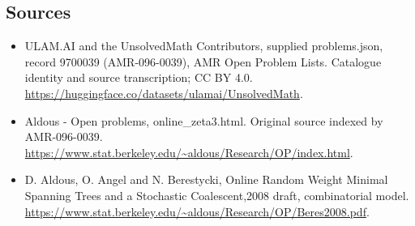 \documentclass[11pt,a4paper]{article}
\begin{document}
\subsection{Sources}
\begin{itemize}
\item[S1] ULAM.AI and the UnsolvedMath Contributors, supplied problems.json, record 9700039 (AMR-096-0039), AMR Open Problem Lists. Catalogue identity and source transcription; CC BY 4.0.
\url{https://huggingface.co/datasets/ulamai/UnsolvedMath}.
\item[S2] Aldous - Open problems, online\_zeta3.html. Original source indexed by AMR-096-0039.
\url{https://www.stat.berkeley.edu/~aldous/Research/OP/index.html}.
\item[S3] D. Aldous, O. Angel and N. Berestycki, Online Random Weight Minimal Spanning Trees and a Stochastic Coalescent,2008 draft, combinatorial model.
\url{https://www.stat.berkeley.edu/~aldous/Research/OP/Beres2008.pdf}.
\end{itemize}
\end{document}
